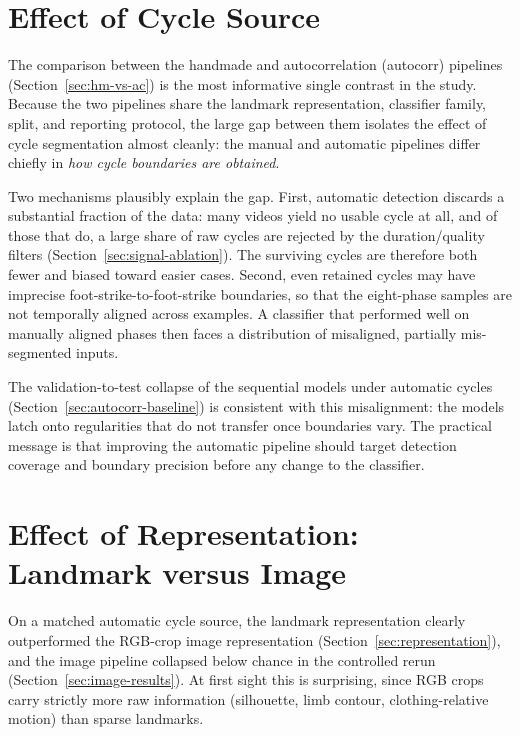 \section{Effect of Cycle Source}
\label{sec:disc-cycle-source}

The comparison between the handmade and autocorrelation (autocorr) pipelines
(Section~\ref{sec:hm-vs-ac}) is the most informative single contrast in the
study. Because the two pipelines share the landmark representation, classifier
family, split, and reporting protocol, the large gap between them isolates the
effect of cycle segmentation almost cleanly: the manual and automatic pipelines
differ chiefly in \emph{how cycle boundaries are obtained}.

Two mechanisms plausibly explain the gap. First, automatic detection discards a
substantial fraction of the data: many videos yield no usable cycle at all, and
of those that do, a large share of raw cycles are rejected by the
duration/quality filters (Section~\ref{sec:signal-ablation}). The surviving
cycles are therefore both fewer and biased toward easier cases. Second, even
retained cycles may have imprecise foot-strike-to-foot-strike boundaries, so
that the eight-phase samples are not temporally aligned across examples. A
classifier that performed well on manually aligned phases then faces a
distribution of misaligned, partially mis-segmented inputs. 

The validation-to-test collapse of the sequential models under automatic cycles
(Section~\ref{sec:autocorr-baseline}) is consistent with this misalignment: the
models latch onto regularities that do not transfer once boundaries vary. The
practical message is that improving the automatic pipeline should target
detection coverage and boundary precision before any change to the classifier.

\section{Effect of Representation: Landmark versus Image}
\label{sec:disc-representation}

On a matched automatic cycle source, the landmark representation clearly
outperformed the RGB-crop image representation
(Section~\ref{sec:representation}), and the image pipeline collapsed below
chance in the controlled rerun (Section~\ref{sec:image-results}). At first
sight this is surprising, since RGB crops carry strictly more raw information
(silhouette, limb contour, clothing-relative motion) than sparse landmarks.

